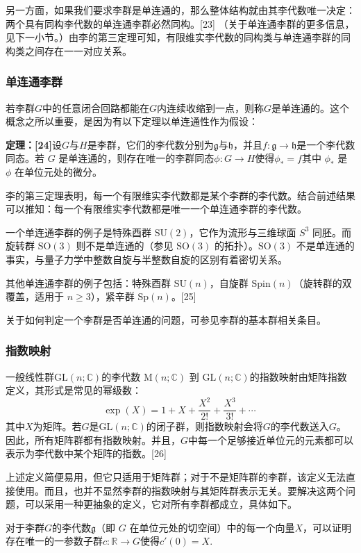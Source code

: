 另一方面，如果我们要求李群是单连通的，那么整体结构就由其李代数唯一决定：两个具有同构李代数的单连通李群必然同构。[23] （关于单连通李群的更多信息，见下一小节。）由李的第三定理可知，有限维实李代数的同构类与单连通李群的同构类之间存在一一对应关系。
\subsubsection{单连通李群}
若李群$G$中的任意闭合回路都能在$G$内连续收缩到一点，则称$G$是单连通的。这个概念之所以重要，是因为有以下定理以单连通性作为假设：

\textbf{定理：[24]}设$G$与$H$是李群，它们的李代数分别为$\mathfrak{g}$与$\mathfrak{h}$，并且$f : \mathfrak{g} \to \mathfrak{h}$是一个李代数同态。若 $G$ 是单连通的，则存在唯一的李群同态$\phi : G \to H$使得$\phi_{*} = f$其中 $\phi_{*}$ 是 $\phi$ 在单位元处的微分。

李的第三定理表明，每一个有限维实李代数都是某个李群的李代数。结合前述结果可以推知：每一个有限维实李代数都是唯一一个单连通李群的李代数。

一个单连通李群的例子是特殊酉群 $\mathrm{SU}(2)$，它作为流形与三维球面 $S^{3}$ 同胚。而旋转群 $\mathrm{SO}(3)$ 则不是单连通的（参见 $\mathrm{SO}(3)$ 的拓扑）。$\mathrm{SO}(3)$ 不是单连通的事实，与量子力学中整数自旋与半整数自旋的区别有着密切关系。

其他单连通李群的例子包括：特殊酉群 $\mathrm{SU}(n)$，自旋群 $\mathrm{Spin}(n)$（旋转群的双覆盖，适用于 $n \geq 3$），紧辛群 $\mathrm{Sp}(n)$。[25]

关于如何判定一个李群是否单连通的问题，可参见李群的基本群相关条目。
\subsubsection{指数映射}
一般线性群$\mathrm{GL}(n;\mathbb{C})$的李代数 $\mathrm{M}(n;\mathbb{C})$ 到 $\mathrm{GL}(n;\mathbb{C})$的指数映射由矩阵指数定义，其形式是常见的幂级数：
$$
\exp(X) = 1 + X + \frac{X^2}{2!} + \frac{X^3}{3!} + \cdots~
$$
其中$X$为矩阵。若$G$是$\mathrm{GL}(n;\mathbb{C})$的闭子群，则指数映射会将$G$的李代数送入$G$。因此，所有矩阵群都有指数映射。并且，$G$中每一个足够接近单位元的元素都可以表示为李代数中某个矩阵的指数。[26]

上述定义简便易用，但它只适用于矩阵群；对于不是矩阵群的李群，该定义无法直接使用。而且，也并不显然李群的指数映射与其矩阵群表示无关。要解决这两个问题，可以采用一种更抽象的定义，它对所有李群都成立，具体如下。

对于李群$G$的李代数$\mathfrak{g}$（即 $G$ 在单位元处的切空间）中的每一个向量$X$，可以证明存在唯一的一参数子群$c : \mathbb{R} \to G$使得$c'(0) = X$.

